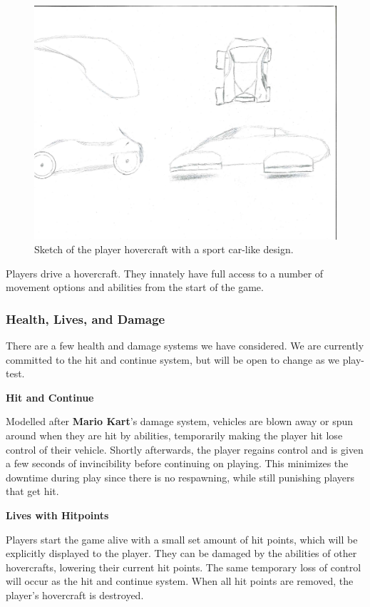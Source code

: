 \documentclass{article}
\theoremstyle{definition}
\begin{document}
\begin{figure}[htpb]
  \centering
  \includegraphics[width=0.8\linewidth]{austin_car1.pdf}
  \caption{Sketch of the player hovercraft with a sport car-like design.}
\label{fig:austin_car1}
\end{figure}

Players drive a hovercraft. They innately have full access to a number of
movement options and abilities from the start of the game.

\subsubsection{Health, Lives, and Damage}

There are a few health and damage systems we have considered. We are currently
committed to the hit and continue system, but will be open to change as we
play-test.

\textbf{Hit and Continue}

Modelled after \textbf{Mario Kart}'s damage system, vehicles are blown away or
spun around when they are hit by abilities, temporarily making the player hit
lose control of their vehicle. Shortly afterwards, the player regains control
and is given a few seconds of invincibility before continuing on playing. This
minimizes the downtime during play since there is no respawning, while still
punishing players that get hit.

\textbf{Lives with Hitpoints}

Players start the game alive with a small set amount of hit points, which will
be explicitly displayed to the player. They can be damaged by the abilities of
other hovercrafts, lowering their current hit points. The same temporary loss
of control will occur as the hit and continue system. When all hit points are
removed, the player's hovercraft is destroyed.
\end{document}
